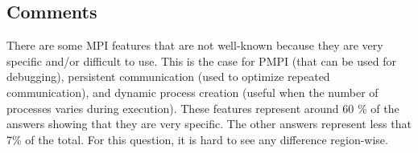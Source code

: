 \subsection{Comments}

There are some MPI features that are not well-known because they are very
specific and/or difficult to use. This is the case for PMPI (that can be used for
debugging), persistent communication (used to optimize repeated communication),
and dynamic process creation (useful when the number of processes varies during
execution). These features represent around  60 \% of the answers showing that
they are very specific. The other answers represent less that 7\% of the
total.  For this question, it is hard to see any difference region-wise.
